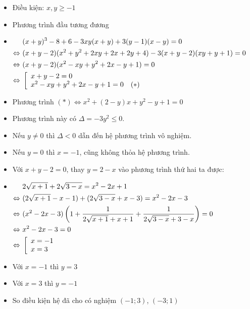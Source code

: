 \lgi 
\begin{itemize}[label=,leftmargin=*]
\item Điều kiện: $x,y\ge -1$
\item Phương trình đầu tương đương
\item $\begin{aligned}[t]
&(x+y)^3-8+6-3xy(x+y)+3(y-1)(x-y)=0 \\
\Leftrightarrow \ &(x+y-2)(x^2+y^2+2xy+2x+2y+4)-3(x+y-2)(xy+y+1)=0 \\
\Leftrightarrow \ &(x+y-2)(x^2-xy+y^2+2x-y+1)=0 \\
\Leftrightarrow \ & \left[\begin{array}{ll}x+y-2=0 \\ x^2-xy+y^2+2x-y+1=0 \quad (*)\end{array}\right.
 \end{aligned}$
 \item Phương trình $(*)\Leftrightarrow x^2+(2-y)x+y^2-y+1=0$
 \item Phương trình này có $\Delta=-3y^2\le 0$.
 \item Nếu $y \ne 0$ thì $\Delta<0$ dẫn đến hệ phương trình vô nghiệm.
 \item Nếu $y=0$ thì $x=-1$, cũng không thỏa hệ phương trình.
 \item Với $x+y-2=0$, thay $y=2-x$ vào phương trình thứ hai ta được:
 \item $\begin{aligned}[t] 
&2\sqrt{x+1}+2\sqrt{3-x}=x^2-2x+1 \\
\Leftrightarrow \ & (2\sqrt{x+1}-x-1)+(2\sqrt{3-x}+x-3)=x^2-2x-3 \\
\Leftrightarrow \ & (x^2-2x-3)\left(1+\dfrac{1}{2\sqrt{x+1}+x+1}+\dfrac{1}{2\sqrt{3-x}+3-x} \right)=0 \\
\Leftrightarrow \ &x^2-2x-3=0 \\
\Leftrightarrow \ & \left[\begin{array}{ll}x=-1 \\ x=3 \end{array}\right.
 \end{aligned}$
 \item Với $x=-1$ thì $y=3$
 \item Với $x=3$ thì $y=-1$
 \item So điều kiện hệ đã cho có nghiệm $(-1;3)$, $(-3;1)$
\end{itemize}


